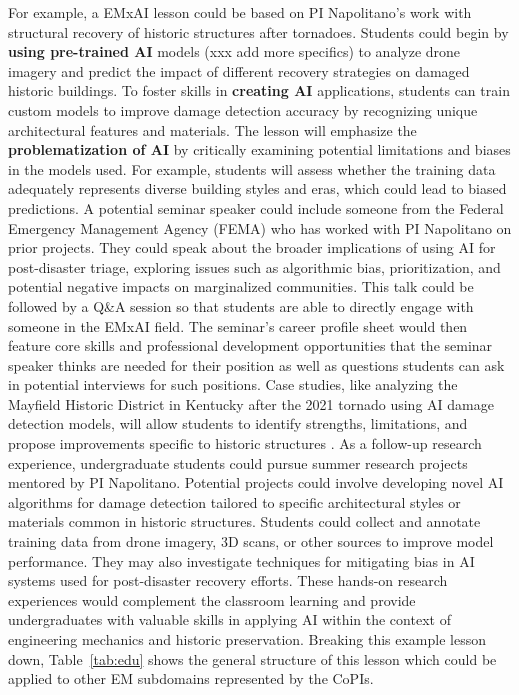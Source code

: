 \documentclass[11pt]{article}
\begin{document}
For example, a EMxAI lesson could be based on PI Napolitano's work with structural recovery of historic structures after tornadoes.  
Students could begin by \textbf{using pre-trained AI} models (xxx add more specifics) to analyze drone imagery and predict the impact of different recovery strategies on damaged historic buildings.
To foster skills in \textbf{creating AI} applications, students can train custom models to improve damage detection accuracy by recognizing unique architectural features and materials. 
The lesson will emphasize the \textbf{problematization of AI} by critically examining potential limitations and biases in the models used. For example, students will assess whether the training data adequately represents diverse building styles and eras, which could lead to biased predictions.
A potential seminar speaker could include someone from the Federal Emergency Management Agency (FEMA) who has worked with PI Napolitano on prior projects. They could speak about the broader implications of using AI for post-disaster triage, exploring issues such as algorithmic bias, prioritization, and potential negative impacts on marginalized communities. 
This talk could be followed by a Q\&A session so that students are able to directly engage with someone in the EMxAI field. 
The seminar's career profile sheet would then feature core skills and professional development opportunities that the seminar speaker thinks are needed for their position as well as questions students can ask in potential interviews for such positions.
Case studies, like analyzing the Mayfield Historic District in Kentucky after the 2021 tornado using AI damage detection models, will allow students to identify strengths, limitations, and propose improvements specific to historic structures \cite{our work}.
As a follow-up research experience, undergraduate students could pursue summer research projects mentored by PI Napolitano. Potential projects could involve developing novel AI algorithms for damage detection tailored to specific architectural styles or materials common in historic structures. Students could collect and annotate training data from drone imagery, 3D scans, or other sources to improve model performance. They may also investigate techniques for mitigating bias in AI systems used for post-disaster recovery efforts. These hands-on research experiences would complement the classroom learning and provide undergraduates with valuable skills in applying AI within the context of engineering mechanics and historic preservation.
Breaking this example lesson down, Table~\ref{tab:edu} shows the general structure of this lesson which could be applied to other EM subdomains represented by the CoPIs. 
\end{document}
